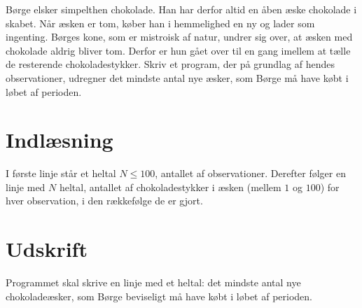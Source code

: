 Børge elsker simpelthen chokolade.
Han har derfor altid en åben æske chokolade i skabet.
Når æsken er tom, køber han i hemmelighed en ny og lader som ingenting.
Børges kone, som er mistroisk af natur, undrer sig over, at æsken med chokolade aldrig bliver tom.
Derfor er hun gået over til en gang imellem at tælle de resterende chokoladestykker. 
Skriv et program, der på grundlag af hendes observationer, udregner det mindste antal nye æsker, som Børge må have købt i løbet af perioden.

\section*{Indlæsning}
I første linje står et heltal $N \le 100$, antallet af observationer.
Derefter følger en linje med $N$ heltal, antallet af chokoladestykker i æsken (mellem $1$ og $100$) for hver observation, i den rækkefølge de er gjort.

\section*{Udskrift}
Programmet skal skrive en linje med et heltal: det mindste antal nye chokoladeæsker, som Børge beviseligt må have købt i løbet af perioden.
